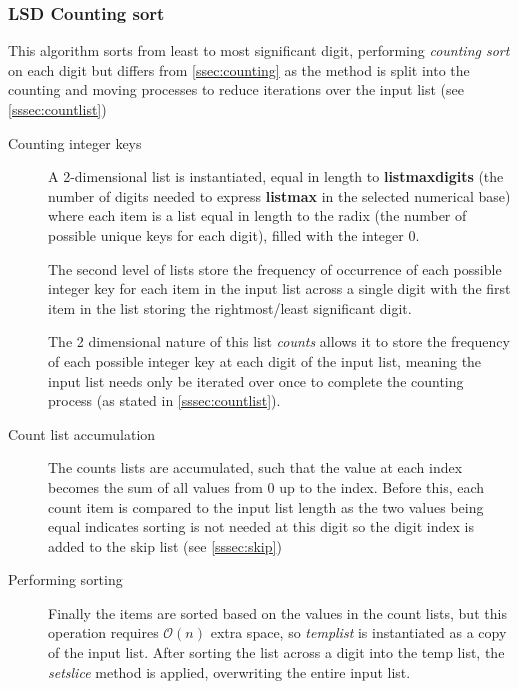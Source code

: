 \documentclass[12pt]{article}
\begin{document}
	\subsubsection{LSD Counting sort}
	\label{sssec:lsdcounting}
	This algorithm sorts from least to most significant digit, performing \textit{counting sort} on each digit but differs from \ref{ssec:counting} as the method is split into the counting and moving processes to reduce iterations over the input list (see \ref{sssec:countlist})
	\begin{description}
		\item[Counting integer keys] A 2-dimensional list is instantiated, equal in length to \textbf{list\textunderscore max\textunderscore digits} (the number of digits needed to express \textbf{list\textunderscore max} in the selected numerical base) where each item is a list equal in length to the radix (the number of possible unique keys for each digit), filled with the integer $0$. 
		\par The second level of lists store the frequency of occurrence of each possible integer key for each item in the input list across a single digit with the first item in the list storing the rightmost/least significant digit.
		\par The 2 dimensional nature of this list \textit{counts} allows it to store the frequency of each possible integer key at each digit of the input list, meaning the input list needs only be iterated over once to complete the counting process (as stated in \ref{sssec:countlist}).
	\item[Count list accumulation] The counts lists are accumulated, such that the value at each index becomes the sum of all values from 0 up to the index. Before this, each count item is compared to the input list length as the two values being equal indicates sorting is not needed at this digit so the digit index is added to the skip list (see \ref{sssec:skip})
	\item[Performing sorting] Finally the items are sorted based on the values in the count lists, but this operation requires $\mathcal{O}(n)$ extra space, so \textit{temp\textunderscore list} is instantiated as a copy of the input list. After sorting the list across a digit into the temp list, the \textit{setslice} method is applied, overwriting the entire input list.
\end{description}
\end{document}
